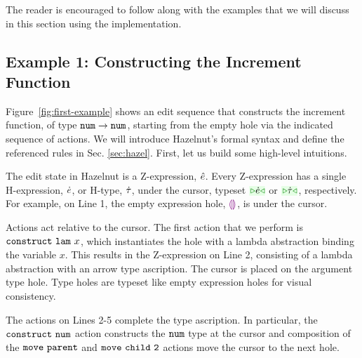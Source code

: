 The reader is encouraged to follow along with the examples that we will
discuss in this section using the implementation.

\subsection{Example 1: Constructing the Increment Function}

Figure~\ref{fig:first-example} shows an edit sequence that constructs the
increment function, of type $\texttt{num} \rightarrow \texttt{num}$, starting from the empty
hole via the indicated sequence of {actions}. We will introduce Hazelnut's
formal syntax and define the referenced rules in
Sec. \ref{sec:hazel}. First, let us build some high-level intuitions.

The edit state in Hazelnut is a {Z-expression}, $\hat{e}$. Every Z-expression
has a single {H-expression}, $\dot{e}$, or {H-type}, $\dot{\tau}$, under the
{cursor}, typeset $\zwsel{\hexp}$ or $\zwsel{\htau}$, respectively. For
example, on Line 1, the empty expression hole, $\textcolor{violet}{\llparenthesis}\textcolor{violet}{\rrparenthesis}$, is under the
cursor.

Actions act relative to the cursor. The first action that we perform is
$\mathtt{construct}~\mathtt{lam}~x$, which instantiates the hole with a lambda
abstraction binding the variable $x$. This results in the Z-expression on
Line 2, consisting of a lambda abstraction with an arrow type
ascription. The cursor is placed on the argument type hole. Type holes are
typeset like empty expression holes for visual consistency.

The actions on Lines 2-5 complete the type ascription. In particular, the
$\mathtt{construct}~\mathtt{num}$ action constructs the $\texttt{num}$ type at the cursor and
composition of the $\mathtt{move}~\mathtt{parent}$ and $\mathtt{move}~\mathtt{child}~\mathtt{{2}}$ actions
move the cursor to the next hole.

